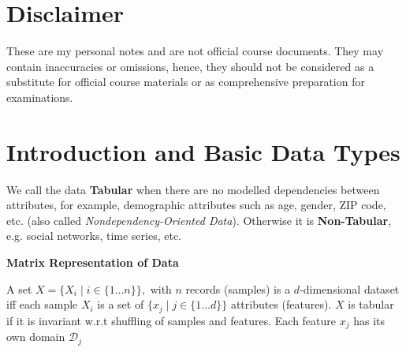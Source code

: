 \documentclass{article}
\begin{document}
\maketitle
\section*{Disclaimer}

These are my personal notes and are not official course documents. They may contain inaccuracies or omissions, hence, they should not be considered as a substitute for official course materials or as comprehensive preparation for examinations.

\section*{Introduction and Basic Data Types}
We call the data \textbf{Tabular} when there are no modelled dependencies between attributes, for example, demographic attributes such as age, gender, ZIP code, etc. (also called \textit{Nondependency-Oriented Data}). Otherwise it is \textbf{Non-Tabular}, e.g. social networks, time series, etc.

\textbf{Matrix Representation of Data}

A set  $X = \{ X_i \mid  i \in \{1 \dots n \}\}, $ with $n$ records (samples) is a $d$-dimensional dataset iff each sample $X_i$ is a set of $\{ x_j \mid j \in \{ 1 \dots d\} \}$ attributes (features). $X$ is tabular if it is invariant w.r.t shuffling of samples and features. Each feature $x_j$ has its own domain $\mathcal{D}_j$




\end{document}

